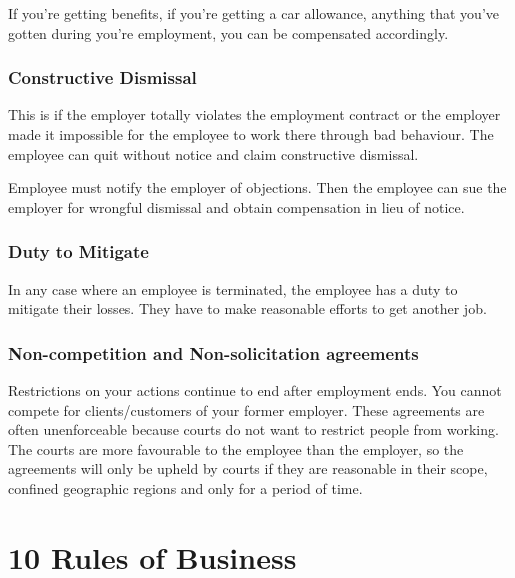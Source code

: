 \documentclass{article}
\begin{document}
If you're getting benefits, if you're getting a car allowance, anything that you've gotten during you're employment, you can be compensated accordingly.

\subsubsection{Constructive  Dismissal}

This is if the employer totally violates the employment contract or the employer made it impossible for the employee to work there through bad behaviour. The employee can quit without notice and claim constructive dismissal. 

Employee must notify the employer of objections. Then the employee can sue the employer for wrongful dismissal and obtain compensation in lieu of notice.

\subsubsection{Duty to Mitigate}

In any case where an employee is terminated, the employee has a duty to mitigate their losses. They have to make reasonable efforts to get another job.

\subsubsection{Non-competition and Non-solicitation agreements}

Restrictions on your actions continue to end after employment ends. You cannot compete for clients/customers of your former employer. These agreements are often unenforceable because courts do not want to restrict people from working. The courts are more favourable to the employee than the employer, so the agreements will only be upheld by courts if they are reasonable in their scope, confined geographic regions and only for a period of time.

\section{10 Rules of Business}
\end{document}
